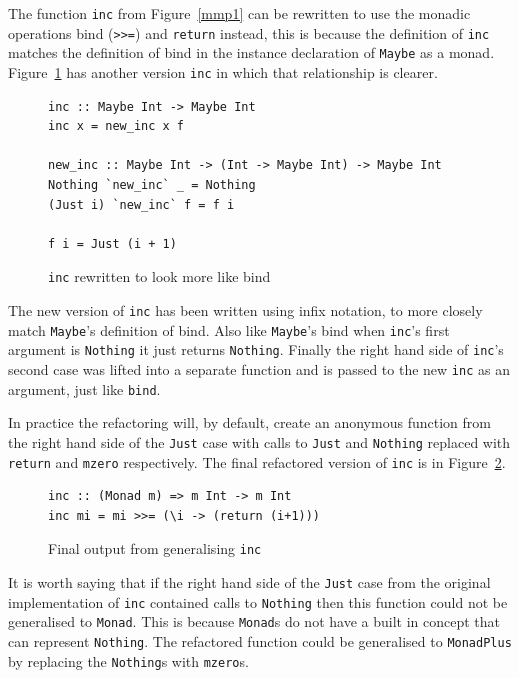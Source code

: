The function \texttt{inc} from Figure~\ref{mmp1} can be rewritten to use the monadic operations bind (\texttt{>>=}) and \texttt{return} instead, this is because the definition of \texttt{inc} matches the definition of bind in the instance declaration of \texttt{Maybe} as a monad. Figure~\ref{incRewrite} has another version \texttt{inc} in which that relationship is clearer.

\begin{figure}[t]
\begin{lstlisting}
inc :: Maybe Int -> Maybe Int
inc x = new_inc x f

new_inc :: Maybe Int -> (Int -> Maybe Int) -> Maybe Int
Nothing `new_inc` _ = Nothing
(Just i) `new_inc` f = f i

f i = Just (i + 1)
\end{lstlisting}
\caption{\texttt{inc} rewritten to look more like bind}
\label{incRewrite}
\end{figure}

The new version of \texttt{inc} has been written using infix notation, to more closely match \texttt{Maybe}'s definition of bind. Also like \texttt{Maybe}'s bind when \texttt{inc}'s first argument is \texttt{Nothing} it just returns \texttt{Nothing}. Finally the right hand side of \texttt{inc}'s second case was lifted into a separate function and is passed to the new \texttt{inc} as an argument, just like \texttt{bind}.

In practice the refactoring will, by default, create an anonymous function from the right hand side of the \texttt{Just} case with calls to \texttt{Just} and \texttt{Nothing} replaced with \texttt{return} and \texttt{mzero} respectively. The final refactored version of \texttt{inc} is in Figure~\ref{mmp1Ref}.

\begin{figure}[t]
\begin{lstlisting}
inc :: (Monad m) => m Int -> m Int
inc mi = mi >>= (\i -> (return (i+1)))
\end{lstlisting}
\caption{Final output from generalising \texttt{inc}}
\label{mmp1Ref}
\end{figure}

It is worth saying that if the right hand side of the \texttt{Just} case from the original implementation of \texttt{inc} contained calls to \texttt{Nothing} then this function could not be generalised to \texttt{Monad}. This is because \texttt{Monad}s do not have a built in concept that can represent \texttt{Nothing}. The refactored function could be generalised to \texttt{MonadPlus} by replacing the \texttt{Nothing}s with \texttt{mzero}s.

